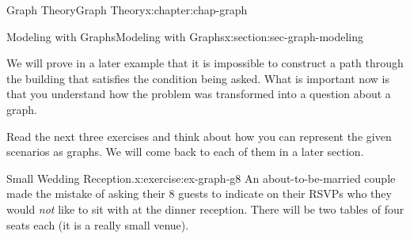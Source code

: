 \documentclass[oneside,10pt,]{book}
\numberwithin{equation}{section}
\begin{document}
\begin{chapterptx}{Graph Theory}{}{Graph Theory}{}{}{x:chapter:chap-graph}
\begin{sectionptx}{Modeling with Graphs}{}{Modeling with Graphs}{}{}{x:section:sec-graph-modeling}
\begin{sidebyside}{2}{0.075}{0.075}{0.15}
\begin{sbspanel}{0.35}
{}%
\end{sbspanel}%
\begin{sbspanel}{0.35}%
%
\end{sbspanel}%
\end{sidebyside}%
\par
We will prove in a later example that it is impossible to construct a path through the building that satisfies the condition being asked. What is important now is that you understand how the problem was transformed into a question about a graph.%
\par
Read the next three exercises and think about how you can represent the given scenarios as graphs. We will come back to each of them in a later section.%
\begin{inlineexercise}{Small Wedding Reception.}{x:exercise:ex-graph-g8}%
An about-to-be-married couple made the mistake of asking their 8 guests to indicate on their RSVPs who they would \emph{not} like to sit with at the dinner reception. There will be two tables of four seats each (it is a really small venue).%

\end{inlineexercise}
\end{sectionptx}
\end{chapterptx}
\end{document}
